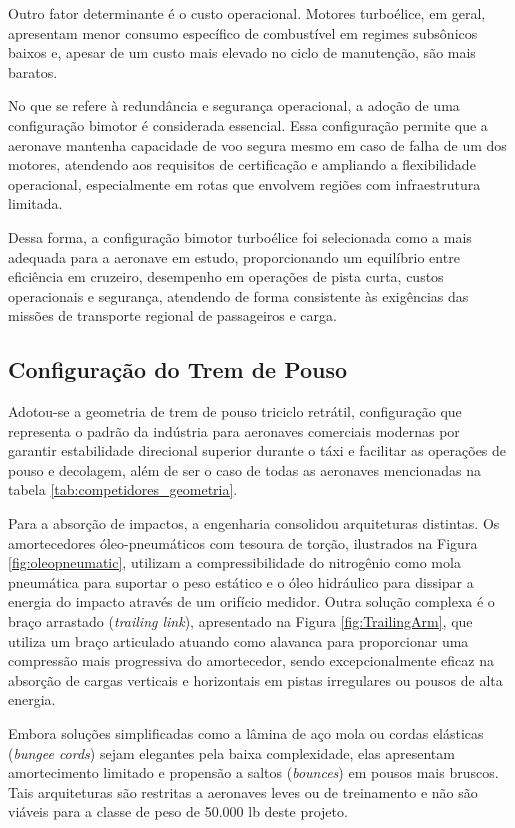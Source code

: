 Outro fator determinante é o custo operacional. Motores turboélice, em geral, apresentam menor consumo específico de combustível em regimes subsônicos baixos e, apesar de um custo mais elevado no ciclo de manutenção, são mais baratos. 

No que se refere à redundância e segurança operacional, a adoção de uma configuração bimotor é considerada essencial. Essa configuração permite que a aeronave mantenha capacidade de voo segura mesmo em caso de falha de um dos motores, atendendo aos requisitos de certificação e ampliando a flexibilidade operacional, especialmente em rotas que envolvem regiões com infraestrutura limitada. 

Dessa forma, a configuração bimotor turboélice foi selecionada como a mais adequada para a aeronave em estudo, proporcionando um equilíbrio entre eficiência em cruzeiro, desempenho em operações de pista curta, custos operacionais e segurança, atendendo de forma consistente às exigências das missões de transporte regional de passageiros e carga.

\subsection{Configuração do Trem de Pouso}

Adotou-se a geometria de trem de pouso triciclo retrátil, configuração que representa o padrão da indústria para aeronaves comerciais modernas por garantir estabilidade direcional superior durante o táxi e facilitar as operações de pouso e decolagem, além de ser o caso de todas as aeronaves mencionadas na tabela \ref{tab:competidores_geometria}.

Para a absorção de impactos, a engenharia consolidou arquiteturas distintas. Os amortecedores óleo-pneumáticos com tesoura de torção, ilustrados na Figura \ref{fig:oleopneumatic}, utilizam a compressibilidade do nitrogênio como mola pneumática para suportar o peso estático e o óleo hidráulico para dissipar a energia do impacto através de um orifício medidor. Outra solução complexa é o braço arrastado (\textit{trailing link}), apresentado na Figura \ref{fig:TrailingArm}, que utiliza um braço articulado atuando como alavanca para proporcionar uma compressão mais progressiva do amortecedor, sendo excepcionalmente eficaz na absorção de cargas verticais e horizontais em pistas irregulares ou pousos de alta energia.

Embora soluções simplificadas como a lâmina de aço mola ou cordas elásticas (\textit{bungee cords}) sejam elegantes pela baixa complexidade, elas apresentam amortecimento limitado e propensão a saltos (\textit{bounces}) em pousos mais bruscos. Tais arquiteturas são restritas a aeronaves leves ou de treinamento e não são viáveis para a classe de peso de 50.000 lb deste projeto. 

